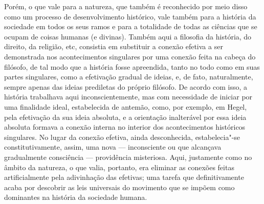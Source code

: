 Porém, o que vale para a natureza, que também é reconhecido por meio
disso como um processo de desenvolvimento histórico, vale também para a
história da sociedade em todos os seus ramos e para a totalidade de
todas as ciências que se ocupam de coisas humanas (e divinas). Também
aqui a filosofia da história, do direito, da religião, etc, consistia em
substituir a conexão efetiva a ser demonstrada nos acontecimentos
singulares por uma conexão feita na cabeça do 
filósofo, de tal modo que a história fosse apreendida, tanto no todo
como em suas partes singulares, como a efetivação gradual de ideias, e,
de fato, naturalmente, sempre apenas das ideias prediletas do próprio
filósofo. De acordo com isso, a história trabalhava aqui
inconscientemente, mas com necessidade de iniciar por uma finalidade
ideal, estabelecida de antemão, como, por exemplo,
em Hegel,
pela efetivação da sua ideia absoluta, e a orientação inalterável por
essa ideia absoluta formava a conexão interna no interior dos
acontecimentos históricos singulares. No lugar da conexão efetiva, ainda
desconhecida, estabelecia"-se constitutivamente, assim,
uma nova --- inconsciente ou que alcançava gradualmente consciência ---
providência misteriosa. Aqui, justamente como no âmbito da natureza, o
que valia, portanto, era eliminar as conexões feitas artificialmente
pela adivinhação  das efetivas; uma tarefa que
definitivamente acaba por descobrir as leis universais do movimento que
se impõem como dominantes na história da sociedade humana.

